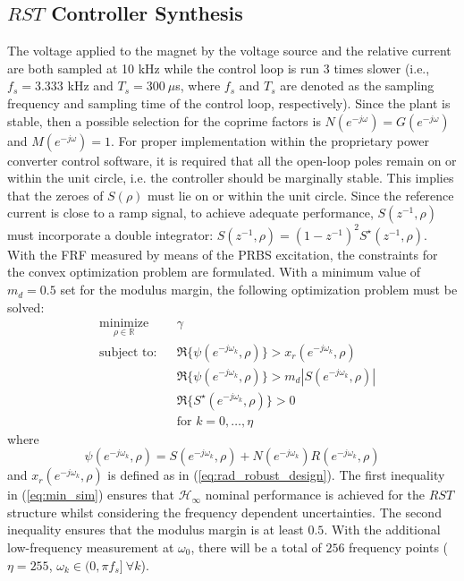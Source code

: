 \documentclass[journal]{IEEEtran}
\newcommand{\jo}{(e^{-j\omega})}
\newcommand{\jok}{(e^{-j\omega_k})}
\newcommand{\jrok}{(e^{-j\omega_k},\rho)}
\begin{document}
\subsection{$RST$ Controller Synthesis}
\label{synthesis}
The voltage applied to the magnet by the voltage source and the relative current are both sampled at 10  kHz while the control loop is run $3$ times slower (i.e., $f_s = 3.333$ kHz and $T_s = 300 \  \mu$s, where $f_s$ and $T_s$ are denoted as the sampling frequency and sampling time of the control loop, respectively).  Since the plant is stable, then a possible selection for the coprime factors is $N\jo = G\jo$ and $M\jo = 1$. For proper implementation within the proprietary power converter control software, it is required that all the open-loop poles remain on or within the unit circle, i.e. the controller should be marginally stable. This implies that the zeroes of $S(\rho)$ must lie on or within the unit circle. Since the reference current is close to a ramp signal, to achieve adequate performance, $S(z^{-1},\rho)$ must incorporate a double integrator: $S(z^{-1},\rho) = (1-z^{-1})^2S^\star(z^{-1},\rho)$. With the FRF measured by means of the PRBS excitation, the constraints for the convex optimization problem are formulated. With a minimum value of $m_d=0.5$ set for the modulus margin, the following optimization problem must be solved: 
\begin{equation} \label{eq:min_sim}
\begin{aligned}
& \underset{ \rho \in \mathbb{R}}{\text{minimize}}
& & \gamma  \\
& \text{subject to:} & & \Re\{\psi \jrok \} > x_r \jrok  \\
& & & \Re\{\psi \jrok \} > m_d|S \jrok|  \\
& & & \Re \{S^{\star}\jrok \}  > 0 \\
& & & \mbox{for }k = 0,\ldots,\eta
\end{aligned}
\end{equation}
where 
\begin{equation*}
\psi \jrok = S \jrok  + N\jok R \jrok  
\end{equation*}
and $x_r \jrok$ is defined as in (\ref{eq:rad_robust_design}). The first inequality in (\ref{eq:min_sim}) ensures that $\mathcal{H}_{\infty}$ nominal performance is achieved for the $RST$ structure whilst considering the frequency dependent uncertainties. The second inequality ensures that the modulus margin is at least $0.5$. With the additional low-frequency measurement at $\omega_0$,  there will be a total of $256$ frequency points ($\eta = 255$, $\omega_k \in (0,\pi f_s] \ \forall k$).
\end{document}

